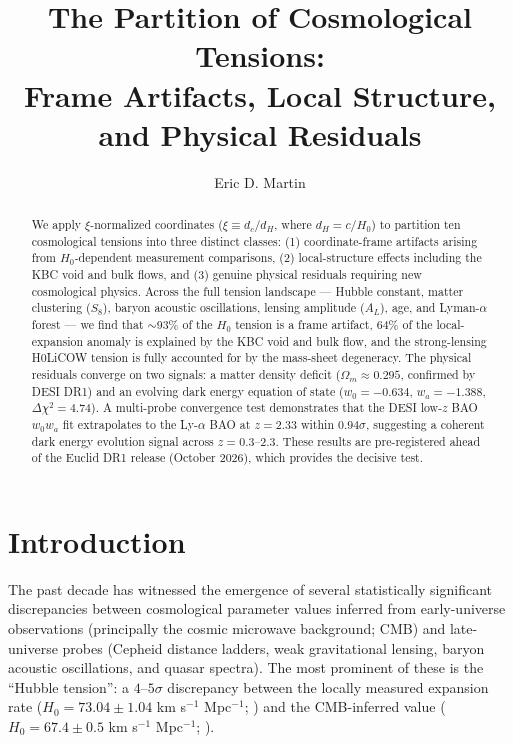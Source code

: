 \documentclass[twocolumn]{aastex631}
\begin{document}
\title{The Partition of Cosmological Tensions: \\
       Frame Artifacts, Local Structure, and Physical Residuals}

\author[0009-0006-5944-1742]{Eric D. Martin}

\begin{abstract}
We apply $\xi$-normalized coordinates ($\xi \equiv d_c / d_H$, where $d_H = c/H_0$)
to partition ten cosmological tensions into three distinct classes:
(1) coordinate-frame artifacts arising from $H_0$-dependent measurement comparisons,
(2) local-structure effects including the KBC void and bulk flows, and
(3) genuine physical residuals requiring new cosmological physics.
Across the full tension landscape --- Hubble constant, matter clustering ($S_8$),
baryon acoustic oscillations, lensing amplitude ($A_L$), age, and Lyman-$\alpha$
forest --- we find that $\sim$93\% of the $H_0$ tension is a frame artifact,
64\% of the local-expansion anomaly is explained by the KBC void and bulk flow,
and the strong-lensing H0LiCOW tension is fully accounted for by the
mass-sheet degeneracy.
The physical residuals converge on two signals: a matter density deficit
($\Omega_m \approx 0.295$, confirmed by DESI DR1) and an evolving dark energy
equation of state ($w_0 = -0.634$, $w_a = -1.388$, $\Delta\chi^2 = 4.74$).
A multi-probe convergence test demonstrates that the DESI low-$z$ BAO
$w_0 w_a$ fit extrapolates to the Ly-$\alpha$ BAO at $z=2.33$ within $0.94\sigma$,
suggesting a coherent dark energy evolution signal across $z = 0.3$--$2.3$.
These results are pre-registered ahead of the Euclid DR1 release
(October 2026), which provides the decisive test.
\end{abstract}



\section{Introduction}

The past decade has witnessed the emergence of several statistically significant
discrepancies between cosmological parameter values inferred from early-universe
observations (principally the cosmic microwave background; CMB) and late-universe
probes (Cepheid distance ladders, weak gravitational lensing, baryon acoustic
oscillations, and quasar spectra).
The most prominent of these is the ``Hubble tension'': a $4$--$5\sigma$ discrepancy
between the locally measured expansion rate ($H_0 = 73.04 \pm 1.04$ km s$^{-1}$ Mpc$^{-1}$;
\citealt{Riess2022}) and the CMB-inferred value ($H_0 = 67.4 \pm 0.5$ km s$^{-1}$ Mpc$^{-1}$;
\citealt{Planck2020}).
\end{document}
